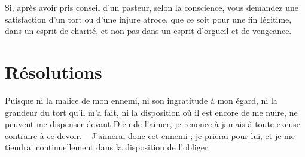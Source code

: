 \documentclass[instructions.tex]{subfiles}
\begin{document}
Si, après avoir pris conseil d'un pasteur, selon la conscience, vous demandez une satisfaction d'un tort ou d'une injure atroce, que ce soit pour une fin légitime, dans un esprit de charité, et non pas dans un esprit d'orgueil et de vengeance.
 
\section{Résolutions}
 
\primo Puisque ni la malice de mon ennemi, ni son ingratitude à mon égard, ni la grandeur du tort qu'il m'a fait, ni la disposition où il est encore de me nuire, ne peuvent me dispenser devant Dieu de l'aimer, je renonce à jamais à toute excuse contraire à ce devoir. -- J'aimerai donc cet ennemi ; je prierai pour lui, et je me tiendrai continuellement dans la disposition de l'obliger. 

 
\end{document}
